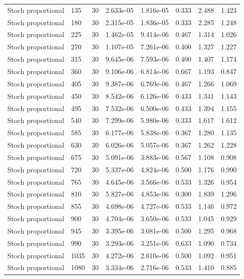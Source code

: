 \begin{scriptsize}
\begin{longtable}{llrrrrrr}
Stoch proportional & 135 & 30 & 2.633e-05 & 1.816e-05 & 0.333 & 2.488 & 1.423 \\
Stoch proportional & 180 & 30 & 2.315e-05 & 1.836e-05 & 0.333 & 2.285 & 1.248 \\
Stoch proportional & 225 & 30 & 1.462e-05 & 9.414e-06 & 0.467 & 1.314 & 1.026 \\
Stoch proportional & 270 & 30 & 1.107e-05 & 7.261e-06 & 0.400 & 1.327 & 1.227 \\
Stoch proportional & 315 & 30 & 9.645e-06 & 7.593e-06 & 0.400 & 1.407 & 1.174 \\
Stoch proportional & 360 & 30 & 9.106e-06 & 6.814e-06 & 0.667 & 1.193 & 0.847 \\
Stoch proportional & 405 & 30 & 9.387e-06 & 6.769e-06 & 0.467 & 1.266 & 1.069 \\
Stoch proportional & 450 & 30 & 8.542e-06 & 6.126e-06 & 0.433 & 1.341 & 1.143 \\
Stoch proportional & 495 & 30 & 7.532e-06 & 6.500e-06 & 0.433 & 1.394 & 1.155 \\
Stoch proportional & 540 & 30 & 7.299e-06 & 5.980e-06 & 0.333 & 1.617 & 1.612 \\
Stoch proportional & 585 & 30 & 6.177e-06 & 5.838e-06 & 0.367 & 1.280 & 1.135 \\
Stoch proportional & 630 & 30 & 6.026e-06 & 5.057e-06 & 0.367 & 1.262 & 1.228 \\
Stoch proportional & 675 & 30 & 5.091e-06 & 3.883e-06 & 0.567 & 1.108 & 0.908 \\
Stoch proportional & 720 & 30 & 5.337e-06 & 4.824e-06 & 0.500 & 1.176 & 0.990 \\
Stoch proportional & 765 & 30 & 4.645e-06 & 3.566e-06 & 0.533 & 1.326 & 0.954 \\
Stoch proportional & 810 & 30 & 5.827e-06 & 4.853e-06 & 0.300 & 1.839 & 1.296 \\
Stoch proportional & 855 & 30 & 4.698e-06 & 4.727e-06 & 0.533 & 1.146 & 0.972 \\
Stoch proportional & 900 & 30 & 4.704e-06 & 3.650e-06 & 0.533 & 1.045 & 0.929 \\
Stoch proportional & 945 & 30 & 3.395e-06 & 3.081e-06 & 0.500 & 1.295 & 0.968 \\
Stoch proportional & 990 & 30 & 3.293e-06 & 3.251e-06 & 0.633 & 1.090 & 0.734 \\
Stoch proportional & 1035 & 30 & 4.272e-06 & 2.610e-06 & 0.500 & 1.092 & 0.951 \\
Stoch proportional & 1080 & 30 & 3.334e-06 & 2.716e-06 & 0.533 & 1.410 & 0.885 \\

\end{longtable}
\end{scriptsize}

